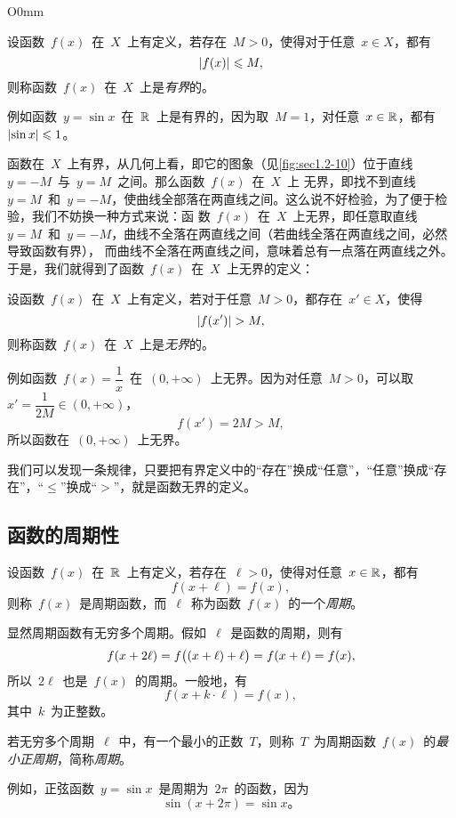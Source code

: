 \begin{wrapfigure}[10]{O}{0mm}
\somefigure
\caption{有界函数}\label{fig:sec1.2-10}
\end{wrapfigure}

设函数~$f(x)$~在~$X$~上有定义，若存在~$M>0$，使得对于任意~$x\in X$，都有
\[
  \lvert f(x)\rvert\leqslant M,
\]
则称函数~$f(x)$~在~$X$~上是\emph{有界}的。

例如函数~$y=\sin x$~在~$\mathbb{R}$~上是有界的，因为取~$M=1$，对任意~$x\in\mathbb{R}$，都有~$\lvert\sin x\rvert\leqslant1$。

函数在~$X$~上有界，从几何上看，即它的图象（见\ref{fig:sec1.2-10}）位于直线~$y=-M$~与~$y=M$~之间。那么函数~$f(x)$~在~$X$~上
无界，即找不到直线~$y=M$~和~$y=-M$，使曲线全部落在两直线之间。这么说不好检验，为了便于检验，我们不妨换一种方式来说：函
数~$f(x)$~在~$X$~上无界，即任意取直线~$y=M$~和~$y=-M$，曲线不全落在两直线之间（若曲线全落在两直线之间，必然导致函数有界），%
而曲线不全落在两直线之间，意味着总有一点落在两直线之外。%
于是，我们就得到了函数~$f(x)$~在~$X$~上无界的定义：

设函数~$f(x)$~在~$X$~上有定义，若对于任意~$M>0$，都存在~$x'\in X$，使得
\[
  \lvert f(x')\rvert>M,
\]
则称函数~$f(x)$~在~$X$~上是\emph{无界}的。

例如函数~$f(x)=\dfrac1x$~在~$(0,+\infty)$~上无界。因为对任意~$M>0$，可以取~$x'=\dfrac1{2M}\in(0,+\infty)$，
\[
  f(x')=2M>M,
\]
所以函数在~$(0,+\infty)$~上无界。

我们可以发现一条规律，只要把有界定义中的“存在”换成“任意”，“任意”换成“存在”，“$\leq$”换成“$>$”，就是函数无界的定义。

\subsection{函数的周期性}

设函数~$f(x)$~在~$\mathbb{R}$~上有定义，若存在~$\ell>0$，使得对任意~$x\in\mathbb{R}$，都有
\[
  f(x+\ell)=f(x),
\]
则称~$f(x)$~是周期函数，而~$\ell$~称为函数~$f(x)$~的一个\emph{周期}。

显然周期函数有无穷多个周期。假如~$\ell$~是函数的周期，则有
\[
  f(x+2\ell)=f\bigl\lparen(x+\ell)+\ell\bigr\rparen=f(x+\ell)=f(x),
\]
所以~$2\ell$~也是~$f(x)$~的周期。一般地，有
\[
  f(x+k\cdot\ell)=f(x),
\]
其中~$k$~为正整数。

若无穷多个周期~$\ell$~中，有一个最小的正数~$T$，则称~$T$~为周期函数~$f(x)$~的\emph{最小正周期}，简称\emph{周期}。

例如，正弦函数~$y=\sin x$~是周期为~$2\pi$~的函数，因为
\[
  \sin(x+2\pi)=\sin x。
\]

